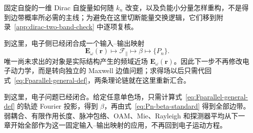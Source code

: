 固定自旋的一维 Dirac 自旋量如何随 $k_n$ 改变，以及负能小分量怎样重构，不是得到边带概率所必需的主线；为避免在这里切断能量交换逻辑，它们移到附录~\ref{app:dirac-two-band-check} 中逐项复核。


到这里，电子侧已经闭合成一个输入--输出映射
\[
\bm E_\omega(\bm r)
\longmapsto
\mathcal F_{\parallel}
\longmapsto
\beta
\longmapsto
\{P_n\}.
\]
唯一尚未求出的对象是实际结构产生的频域近场 $\bm E_\omega(\bm r)$。因此下一步不再修改电子动力学，而是转向独立的 Maxwell 边值问题；求得场以后只需代回式~\eqref{eq:Fparallel-general-def}，两条理论链就在这里重新汇合。

到这里，电子问题已经闭合。给定任意单色场，只需计算式~\eqref{eq:Fparallel-general-def} 的轨迹 Fourier 投影，得到 \(\beta\)，再由式~\eqref{eq:Pn-beta-standard} 得到全部边带。弱耦合、有限作用长度、脉冲包络、OAM、Mie、Rayleigh 和探测器平均从下一章开始全部作为这一固定输入--输出映射的应用，不再回到电子运动方程。
